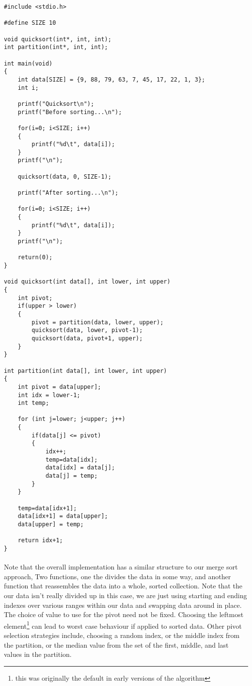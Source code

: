 \documentclass[10pt, a4paper, twosize]{article}
\begin{document}
\begin{lstlisting}
#include <stdio.h>

#define SIZE 10

void quicksort(int*, int, int);
int partition(int*, int, int);

int main(void)
{
    int data[SIZE] = {9, 88, 79, 63, 7, 45, 17, 22, 1, 3};
    int i;

    printf("Quicksort\n");
    printf("Before sorting...\n");

    for(i=0; i<SIZE; i++)
    {
        printf("%d\t", data[i]);
    }
    printf("\n");

    quicksort(data, 0, SIZE-1);

    printf("After sorting...\n");

    for(i=0; i<SIZE; i++)
    {
        printf("%d\t", data[i]);
    }
    printf("\n");

    return(0);
}

void quicksort(int data[], int lower, int upper)
{
    int pivot;
    if(upper > lower)
    {
        pivot = partition(data, lower, upper);
        quicksort(data, lower, pivot-1);
        quicksort(data, pivot+1, upper);
    }
}

int partition(int data[], int lower, int upper)
{
    int pivot = data[upper];
    int idx = lower-1;
    int temp;
    
    for (int j=lower; j<upper; j++)
    {
        if(data[j] <= pivot)
        {
            idx++;
            temp=data[idx];
            data[idx] = data[j];
            data[j] = temp;
        }
    }
    
    temp=data[idx+1];
    data[idx+1] = data[upper];
    data[upper] = temp;
    
    return idx+1;
}
\end{lstlisting}

\paragraph{} Note that the overall implementation has a similar structure to our merge sort approach, Two functions, one the divides the data in some way, and another function that reassembles the data into a whole, sorted collection. Note that the our data isn't really divided up in this case, we are just using starting and ending indexes over various ranges within our data and swapping data around in place. The choice of value to use for the pivot need not be fixed. Choosing the leftmost element\footnote{this was originally the default in early versions of the algorithm} can lead to worst case behaviour if applied to sorted data. Other pivot selection strategies include, choosing a random index, or the middle index from the partition, or the median value from the set of the first, middle, and last values in the partition.
\end{document}
